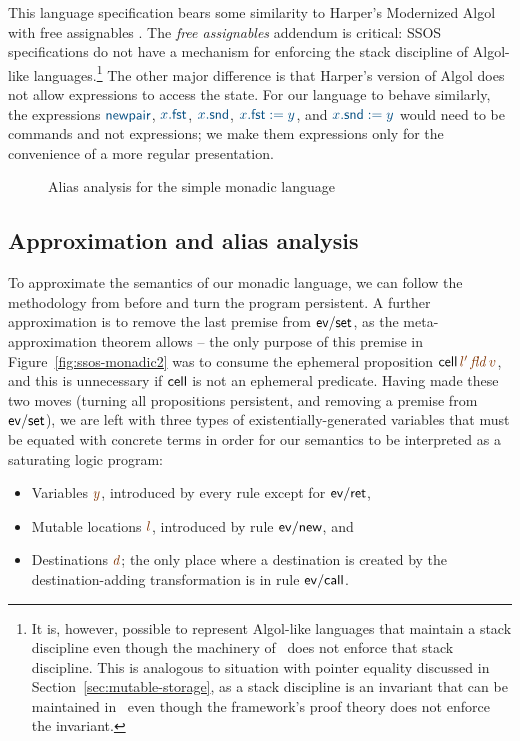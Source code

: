 This language specification bears some similarity to Harper's
Modernized Algol with free assignables \cite[Chapter
36]{harper12practical}. The {\it free assignables} addendum is
critical: SSOS specifications do not have a mechanism for enforcing
the stack discipline of Algol-like languages.\footnote{It is, however,
  possible to represent Algol-like languages that maintain a stack
  discipline even though the machinery of \sls~does not enforce that
  stack discipline. This is analogous to situation with pointer
  equality discussed in Section~\ref{sec:mutable-storage}, as a stack
  discipline is an invariant that can be maintained in \sls~even
  though the framework's proof theory does not enforce the invariant.}
The other major difference is that Harper's version of Algol does not
allow expressions to access the state.  For our language to behave
similarly, the expressions $\obj{\sf newpair}$, $\obj{x.{\sf fst}}$,
$\obj{x.{\sf snd}}$, $\obj{x.{\sf fst} := y}$, and $\obj{x.{\sf snd}
  := y}$ would need to be commands and not expressions; we make them
expressions only for the convenience of a more regular presentation.

\begin{figure}
\caption{Alias analysis for the simple monadic language}
\label{fig:ssos-monadic-approx}
\end{figure}



\subsection{Approximation and alias analysis}


To approximate the semantics of our monadic language, we can follow the
methodology from before and turn the program persistent. A further
approximation is to remove the last premise from ${\sf ev/set}$, as
the meta-approximation theorem allows -- the only purpose of this
premise in Figure~\ref{fig:ssos-monadic2} was to consume the ephemeral
proposition ${\sf cell}\,\lf{l'}\,\lf{\it fld}\,\lf{v}$, and this is unnecessary
if ${\sf cell}$ is not an ephemeral predicate.  Having
made these two moves (turning all propositions persistent, and removing
a premise from ${\sf ev/set}$), we are left with three types of
existentially-generated variables that must be equated with concrete
terms in order for our semantics to be interpreted as a saturating
logic program:

\smallskip
\begin{itemize}
\item Variables $\lf{y}$, introduced by every rule except for ${\sf ev/ret}$,
\item Mutable locations $\lf{l}$, introduced by rule ${\sf ev/new}$, and 
\item Destinations $\lf{d}$; the only place where a destination is created
by the destination-adding transformation is in rule ${\sf ev/call}$.
\end{itemize}
\smallskip

